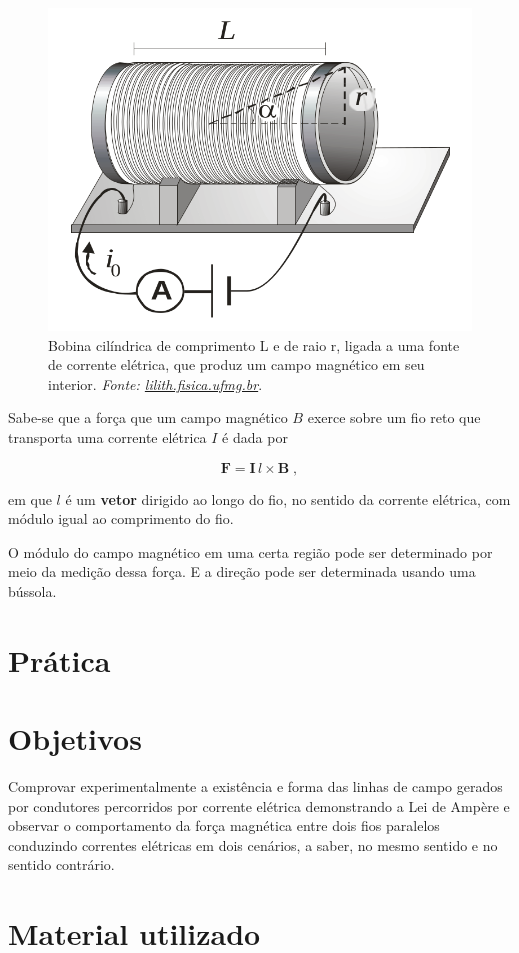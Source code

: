 \begin{figure}
    \centering
    \includegraphics[width=.36\textwidth]{img/bobina-lilith.png}
    \caption{Bobina cilíndrica de comprimento L e de raio r, ligada a uma fonte de
corrente elétrica, que produz um campo magnético em seu interior. \textit{Fonte: \href{http://lilith.fisica.ufmg.br}{lilith.fisica.ufmg.br}}.}
    \label{fig:bobina-lilith}
\end{figure}

\noindent

Sabe-se que a força que um campo magnético $B$ exerce sobre um fio reto que transporta uma
corrente elétrica $I$ é dada por

\begin{equation}
    \mathbf{F}=\mathbf{I}\,l\times \mathbf{B}\;,
\end{equation}

\noindent 
em que {\color{red}$l$ é um \textbf{vetor} dirigido ao longo do fio}, no sentido da corrente elétrica, com módulo igual ao
comprimento do fio.

\noindent
O módulo do campo magnético em uma certa região pode ser determinado por meio da
medição dessa força. E a direção pode ser determinada usando uma bússola.

\section*{Prática}

	\section{Objetivos}
	
\noindent 
Comprovar experimentalmente a existência e forma das linhas de campo gerados por condutores percorridos por corrente elétrica demonstrando a Lei de Ampère e observar o comportamento da força magnética entre dois fios paralelos conduzindo correntes elétricas em dois cenários, a saber, no mesmo sentido e no sentido contrário.

	\section{Material utilizado}
	
